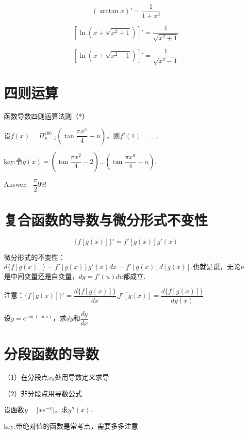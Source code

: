\documentclass[12pt, a4paper, oneside]{ctexbook}
\begin{document}
\[(\arctan x)'=\dfrac{1}{1+x^2}\]

\[[\ln(x+\sqrt{x^2+1})]'=\dfrac{1}{\sqrt{x^2+1}}\]

\[[\ln(x+\sqrt{x^2-1})]'=\dfrac{1}{\sqrt{x^2-1}}\]


\section{四则运算}

函数导数四则运算法则（*）

\hspace*{\fill}


设$f(x)=\Pi_{n=1}^{100}(\tan \dfrac{\pi x^n}{4}-n)$，则$f'(1)=\_\_\_.$

key:令$g(x)=(\tan \dfrac{\pi x^2}{4}-2)...(\tan \dfrac{\pi x^n}{4}-n)$.

Answer:$-\dfrac{\pi}{2}99!$

\hspace*{\fill}



\section{复合函数的导数与微分形式不变性}

\[\{f[g(x)]\}'=f'[g(x)]g'(x)\]

微分形式的不变性：$d\{f[g(x)]\}=f'[g(x)]g'(x)dx=f'[g(x)]d[g(x)]$.也就是说，无论$u$是中间变量还是自变量，$dy=f'(u)du$都成立.

\hspace*{\fill}

注意：$\{f[g(x)]\}'=\dfrac{d\{f[g(x)]\}}{dx}$,$f'[g(x)]=\dfrac{d\{f[g(x)]\}}{dg(x)}$

\hspace*{\fill}

设$y=e^{\sin(\ln x)}$，求$dy$和$\dfrac{dy}{dx}$



\section{分段函数的导数}

（1）在分段点$x_0$处用导数定义求导

（2）非分段点用导数公式

\hspace*{\fill}


设函数$y=|xe^{-x}|$，求$y''(x)$.

key:带绝对值的函数是常考点，需要多多注意
\end{document}

